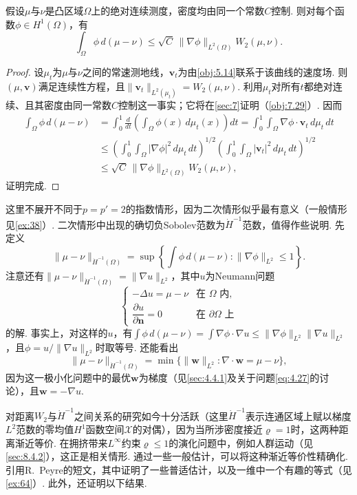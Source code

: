 \begin{lemma}\label{obj:5.33}
假设$\mu$与$\nu$是凸区域$\Omega$上的绝对连续测度，密度均由同一个常数$C$控制. 则对每个函数$\phi\in H^1(\Omega)$，有
\[
\int_\Omega\phi\,d(\mu-\nu)\le\sqrt C\,\|\nabla\phi\|_{L^2(\Omega)}W_2(\mu,\nu).
\]
\end{lemma}
\begin{proof}
设$\mu_t$为$\mu$与$\nu$之间的常速测地线，$\mathbf v_t$为由\autoref{obj:5.14}联系于该曲线的速度场. 则$(\mu,\mathbf v)$满足连续性方程，且$\|\mathbf v_t\|_{L^2(\mu_t)}=W_2(\mu,\nu)$. 利用$\mu_t$对所有$t$都绝对连续、且其密度由同一常数$C$控制这一事实；它将在\autoref{sec:7}证明（\autoref{obj:7.29}）. 因而
\[
\begin{aligned}
\int_\Omega\phi\,d(\mu-\nu)
&=\int_0^1\frac d{dt}\left(\int_\Omega\phi(x)\,d\mu_t(x)\right)dt
=\int_0^1\int_\Omega\nabla\phi\cdot\mathbf v_t\,d\mu_t\,dt\\
&\le\left(\int_0^1\int_\Omega|\nabla\phi|^2\,d\mu_t\,dt\right)^{1/2}
\left(\int_0^1\int_\Omega|\mathbf v_t|^2\,d\mu_t\,dt\right)^{1/2}\\
&\le\sqrt C\,\|\nabla\phi\|_{L^2(\Omega)}W_2(\mu,\nu),
\end{aligned}
\]
证明完成.
\end{proof}

\label{idx:root5-p210-hminusone}这里不展开不同于$p=p'=2$的指数情形，因为二次情形似乎最有意义（一般情形见\autoref{ex:38}）. 二次情形中出现的确切负Sobolev范数为$\dot H^{-1}$范数，值得作些说明. 先定义
\[
\|\mu-\nu\|_{\dot H^{-1}(\Omega)}
=\sup\left\{\int\phi\,d(\mu-\nu):\|\nabla\phi\|_{L^2}\le1\right\}.
\]
注意还有$\|\mu-\nu\|_{\dot H^{-1}(\Omega)}=\|\nabla u\|_{L^2}$，其中$u$为Neumann问题
\[
\begin{cases}-\Delta u=\mu-\nu&\text{在 }\Omega\text{ 内},\\
\dfrac{\partial u}{\partial\mathbf n}=0&\text{在 }\partial\Omega\text{ 上}
\end{cases}
\]
的解. 事实上，对这样的$u$，有$\int\phi\,d(\mu-\nu)=\int\nabla\phi\cdot\nabla u\le\|\nabla\phi\|_{L^2}\|\nabla u\|_{L^2}$，且$\phi=u/\|\nabla u\|_{L^2}$时取等号. 还能看出
\[
\|\mu-\nu\|_{\dot H^{-1}(\Omega)}=\min\{\|\mathbf w\|_{L^2}:\nabla\cdot\mathbf w=\mu-\nu\},
\]
因为这一极小化问题中的最优$\mathbf w$为梯度（见\autoref{sec:4.4.1}及关于问题\eqref{eq:4.27}的讨论），且$\mathbf w=-\nabla u$.

\label{idx:root5-p211-crowd}对距离$W_2$与$\dot H^{-1}$之间关系的研究如今十分活跃（这里$\dot H^{-1}$表示连通区域上赋以梯度$L^2$范数的零均值$H^1$函数空间$\mathscr X$的对偶），因为当所涉密度接近$\varrho=1$时，这两种距离渐近等价. 在拥挤带来$L^\infty$约束$\varrho\le1$的演化问题中，例如人群运动（见\autoref{sec:8.4.2}），这正是相关情形. 通过一些一般估计，可以将这种渐近等价性精确化. 引用R.~Peyre的短文\cite{b251}，其中证明了一些普适估计，以及一维中一个有趣的等式（见\autoref{ex:64}）. 此外，还证明以下结果.

